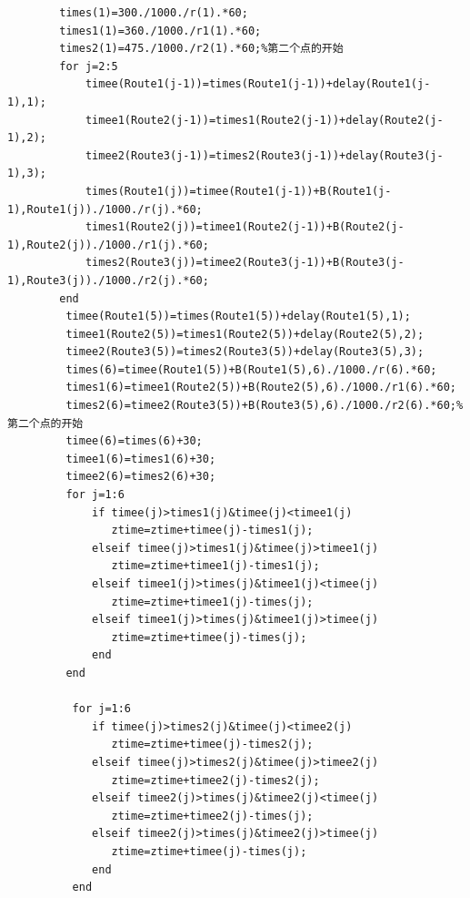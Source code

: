\documentclass[hyperref,UTF8]{article}
\begin{document}
\begin{lstlisting}
        times(1)=300./1000./r(1).*60;
        times1(1)=360./1000./r1(1).*60;
        times2(1)=475./1000./r2(1).*60;%第二个点的开始
        for j=2:5
            timee(Route1(j-1))=times(Route1(j-1))+delay(Route1(j-1),1);
            timee1(Route2(j-1))=times1(Route2(j-1))+delay(Route2(j-1),2);
            timee2(Route3(j-1))=times2(Route3(j-1))+delay(Route3(j-1),3);
            times(Route1(j))=timee(Route1(j-1))+B(Route1(j-1),Route1(j))./1000./r(j).*60;
            times1(Route2(j))=timee1(Route2(j-1))+B(Route2(j-1),Route2(j))./1000./r1(j).*60;
            times2(Route3(j))=timee2(Route3(j-1))+B(Route3(j-1),Route3(j))./1000./r2(j).*60;
        end
         timee(Route1(5))=times(Route1(5))+delay(Route1(5),1);
         timee1(Route2(5))=times1(Route2(5))+delay(Route2(5),2);
         timee2(Route3(5))=times2(Route3(5))+delay(Route3(5),3);
         times(6)=timee(Route1(5))+B(Route1(5),6)./1000./r(6).*60;
         times1(6)=timee1(Route2(5))+B(Route2(5),6)./1000./r1(6).*60;
         times2(6)=timee2(Route3(5))+B(Route3(5),6)./1000./r2(6).*60;%第二个点的开始
         timee(6)=times(6)+30;
         timee1(6)=times1(6)+30;
         timee2(6)=times2(6)+30;
         for j=1:6
             if timee(j)>times1(j)&timee(j)<timee1(j)
                ztime=ztime+timee(j)-times1(j);
             elseif timee(j)>times1(j)&timee(j)>timee1(j)
                ztime=ztime+timee1(j)-times1(j);
             elseif timee1(j)>times(j)&timee1(j)<timee(j)
                ztime=ztime+timee1(j)-times(j);
             elseif timee1(j)>times(j)&timee1(j)>timee(j)
                ztime=ztime+timee(j)-times(j);
             end
         end
         
          for j=1:6
             if timee(j)>times2(j)&timee(j)<timee2(j)
                ztime=ztime+timee(j)-times2(j);
             elseif timee(j)>times2(j)&timee(j)>timee2(j)
                ztime=ztime+timee2(j)-times2(j);
             elseif timee2(j)>times(j)&timee2(j)<timee(j)
                ztime=ztime+timee2(j)-times(j);
             elseif timee2(j)>times(j)&timee2(j)>timee(j)
                ztime=ztime+timee(j)-times(j);
             end
          end
         

\end{lstlisting}
\end{document}
